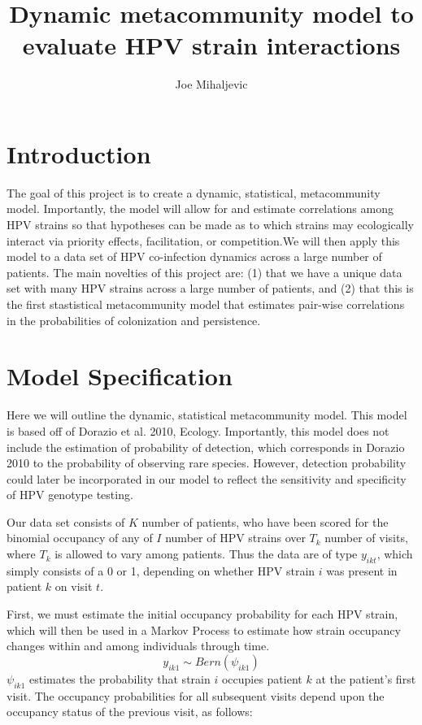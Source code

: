 \documentclass{article}
\title{Dynamic metacommunity model to evaluate HPV strain interactions}
\author{Joe Mihaljevic}
\begin{document}
%
\maketitle

\section*{Introduction}

The goal of this project is to create a dynamic, statistical, metacommunity model. Importantly, the model will allow for and estimate correlations among HPV strains so that hypotheses can be made as to which strains may ecologically interact via priority effects, facilitation, or competition.We will then apply this model to a data set of HPV co-infection dynamics across a large number of patients. The main novelties of this project are: (1) that we have a unique data set with many HPV strains across a large number of patients, and (2) that this is the first stastistical metacommunity model that estimates pair-wise correlations in the probabilities of colonization and persistence.

\section*{Model Specification}

Here we will outline the dynamic, statistical metacommunity model. This model is based off of Dorazio et al. 2010, Ecology. Importantly, this model does not include the estimation of probability of detection, which corresponds in Dorazio 2010 to the probability of observing rare species. However, detection probability could later be incorporated in our model to reflect the sensitivity and specificity of HPV genotype testing.

Our data set consists of $K$ number of patients, who have been scored for the binomial occupancy of any of $I$ number of HPV strains over $T_{k}$ number of visits, where $T_{k}$ is allowed to vary among patients. Thus the data are of type $y_{ikt}$, which simply consists of a 0 or 1, depending on whether HPV strain $i$ was present in patient $k$ on visit $t$. 

First, we must estimate the initial occupancy probability for each HPV strain, which will then be used in a Markov Process to estimate how strain occupancy changes within and among individuals through time. 
$$y_{ik1} \sim Bern(\psi_{ik1})$$
$\psi_{ik1}$ estimates the probability that strain $i$ occupies patient $k$ at the patient's first visit. The occupancy probabilities for all subsequent visits depend upon the occupancy status of the previous visit, as follows:
\end{document}
